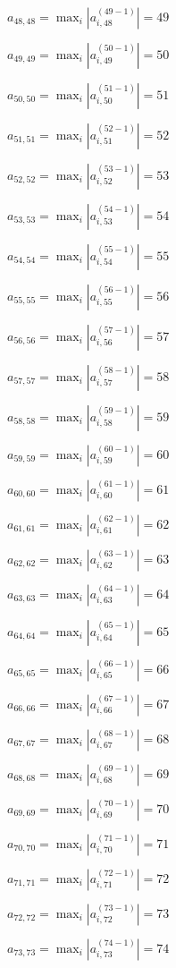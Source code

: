 \documentclass[a4paper,12pt]{article}
\begin{document}
$a _{ 48, 48 } =  \max _i |a _{ i, 48 } ^{ (49 - 1) } | = 49$

$a _{ 49, 49 } =  \max _i |a _{ i, 49 } ^{ (50 - 1) } | = 50$

$a _{ 50, 50 } =  \max _i |a _{ i, 50 } ^{ (51 - 1) } | = 51$

$a _{ 51, 51 } =  \max _i |a _{ i, 51 } ^{ (52 - 1) } | = 52$

$a _{ 52, 52 } =  \max _i |a _{ i, 52 } ^{ (53 - 1) } | = 53$

$a _{ 53, 53 } =  \max _i |a _{ i, 53 } ^{ (54 - 1) } | = 54$

$a _{ 54, 54 } =  \max _i |a _{ i, 54 } ^{ (55 - 1) } | = 55$

$a _{ 55, 55 } =  \max _i |a _{ i, 55 } ^{ (56 - 1) } | = 56$

$a _{ 56, 56 } =  \max _i |a _{ i, 56 } ^{ (57 - 1) } | = 57$

$a _{ 57, 57 } =  \max _i |a _{ i, 57 } ^{ (58 - 1) } | = 58$

$a _{ 58, 58 } =  \max _i |a _{ i, 58 } ^{ (59 - 1) } | = 59$

$a _{ 59, 59 } =  \max _i |a _{ i, 59 } ^{ (60 - 1) } | = 60$

$a _{ 60, 60 } =  \max _i |a _{ i, 60 } ^{ (61 - 1) } | = 61$

$a _{ 61, 61 } =  \max _i |a _{ i, 61 } ^{ (62 - 1) } | = 62$

$a _{ 62, 62 } =  \max _i |a _{ i, 62 } ^{ (63 - 1) } | = 63$

$a _{ 63, 63 } =  \max _i |a _{ i, 63 } ^{ (64 - 1) } | = 64$

$a _{ 64, 64 } =  \max _i |a _{ i, 64 } ^{ (65 - 1) } | = 65$

$a _{ 65, 65 } =  \max _i |a _{ i, 65 } ^{ (66 - 1) } | = 66$

$a _{ 66, 66 } =  \max _i |a _{ i, 66 } ^{ (67 - 1) } | = 67$

$a _{ 67, 67 } =  \max _i |a _{ i, 67 } ^{ (68 - 1) } | = 68$

$a _{ 68, 68 } =  \max _i |a _{ i, 68 } ^{ (69 - 1) } | = 69$

$a _{ 69, 69 } =  \max _i |a _{ i, 69 } ^{ (70 - 1) } | = 70$

$a _{ 70, 70 } =  \max _i |a _{ i, 70 } ^{ (71 - 1) } | = 71$

$a _{ 71, 71 } =  \max _i |a _{ i, 71 } ^{ (72 - 1) } | = 72$

$a _{ 72, 72 } =  \max _i |a _{ i, 72 } ^{ (73 - 1) } | = 73$

$a _{ 73, 73 } =  \max _i |a _{ i, 73 } ^{ (74 - 1) } | = 74$
\end{document}

